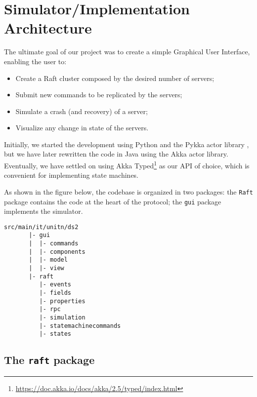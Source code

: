 \section{Simulator/Implementation Architecture}
\label{architecture}

The ultimate goal of our project was to create a simple Graphical User Interface, enabling the user to:
\begin{itemize}
    \item Create a Raft cluster composed by the desired number of servers;
    \item Submit new commands to be replicated by the servers;
    \item Simulate a crash (and recovery) of a server;
    \item Visualize any change in state of the servers.
\end{itemize}

Initially, we started the development using Python and the Pykka actor library \cite{pykka}, but we have later rewritten the code in Java using the Akka \cite{akka} actor library.
Eventually, we have settled on using Akka Typed\footnote{\url{https://doc.akka.io/docs/akka/2.5/typed/index.html}} as our API of choice, which is convenient for implementing state machines.


As shown in the figure below, the codebase is organized in two packages: the \texttt{Raft} package contains the code at the heart of the protocol; the \texttt{gui} package implements the simulator.

\begin{Verbatim}[samepage]
    src/main/it/unitn/ds2
       |- gui
       |  |- commands
       |  |- components
       |  |- model
       |  |- view
       |- raft
          |- events
          |- fields
          |- properties
          |- rpc
          |- simulation
          |- statemachinecommands
          |- states
\end{Verbatim}

\subsection{The \texttt{raft} package}

